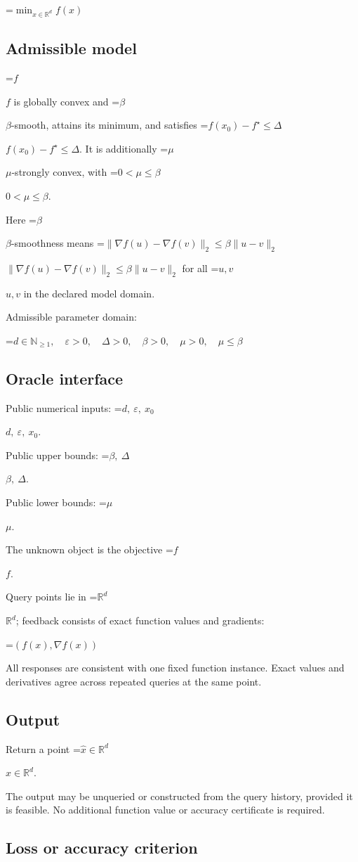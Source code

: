 \documentclass[10pt,a4paper]{article}
\newcommand{\AtlasMath}[1]{\par\begingroup\centering\setbox0=\hbox{$\displaystyle #1$}\ifdim\wd0>1.4\linewidth\typeout{ATLAS WIDE FORMULA: \the\wd0}\fi\ifdim\wd0>\linewidth\resizebox{\linewidth}{!}{\box0}\else\box0\fi\par\endgroup}
\newcommand{\AtlasInlineMath}[1]{\begingroup\setbox0=\hbox{$#1$}\ifdim\wd0>.4\linewidth\endgroup\AtlasMath{#1}\else\endgroup$#1$\fi}
\begin{document}
\AtlasMath{\min_{x\in \mathbb{R}^d}f(x)}


\subsection{Admissible model}
\AtlasInlineMath{f} is globally convex and \AtlasInlineMath{\beta}-smooth, attains its minimum, and satisfies \AtlasInlineMath{f(x_0)-f^\star\le\Delta}. It is additionally \AtlasInlineMath{\mu}-strongly convex, with \AtlasInlineMath{0<\mu\le\beta}.

Here \AtlasInlineMath{\beta}-smoothness means \AtlasInlineMath{\|\nabla f(u)-\nabla f(v)\|_2\le\beta\|u-v\|_2} for all \AtlasInlineMath{u,v} in the declared model domain.

Admissible parameter domain:


\AtlasMath{d\in\mathbb{N}_{\ge1},\quad \varepsilon>0,\quad \Delta>0,\quad \beta>0,\quad \mu>0,\quad \mu\le\beta}


\subsection{Oracle interface}
Public numerical inputs: \AtlasInlineMath{d,\ \varepsilon,\ x_0}.

Public upper bounds: \AtlasInlineMath{\beta,\ \Delta}.

Public lower bounds: \AtlasInlineMath{\mu}.

The unknown object is the objective \AtlasInlineMath{f}.

Query points lie in \AtlasInlineMath{\mathbb{R}^d}; feedback consists of exact function values and gradients:


\AtlasMath{(f(x),\nabla f(x))}


All responses are consistent with one fixed function instance. Exact values and derivatives agree across repeated queries at the same point.

\subsection{Output}
Return a point \AtlasInlineMath{\widehat x\in\mathbb R^d}.

The output may be unqueried or constructed from the query history, provided it is feasible. No additional function value or accuracy certificate is required.

\subsection{Loss or accuracy criterion}
\end{document}
